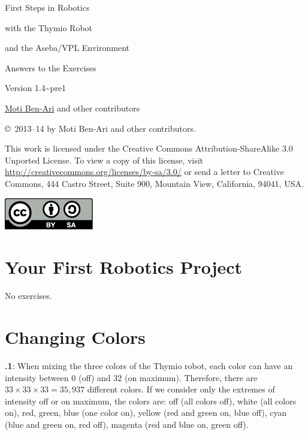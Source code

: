 \documentclass[11pt,a4paper,english]{article}
\begin{document}
\thispagestyle{empty}

\begin{center}
\begin{bfseries}

\begin{Large}
First Steps in Robotics

with the
Thymio Robot

and the
Aseba/VPL Environment

\bigskip

Answers to the Exercises

\end{Large}

Version 1.4{\textasciitilde}pre1

\bigskip

\href{http://www.weizmann.ac.il/sci-tea/benari/}{Moti Ben-Ari} and other contributors

\end{bfseries}
\end{center}

\bigskip

\copyright{}\  2013--14 by Moti Ben-Ari and other contributors.

This work is licensed under the Creative Commons
Attribution-ShareAlike 3.0 Unported License. To view a copy
of this license, visit
\url{http://creativecommons.org/licenses/by-sa/3.0/}
or send a letter to Creative Commons, 444 Castro Street, Suite 900,
Mountain View, California, 94041, USA.

\begin{center}
\hspace{6pt}\includegraphics[width=.2\textwidth]{../images/by-sa}
\end{center}

\section{Your First Robotics Project}

No exercises.

\section{Changing Colors}

\textbf{\thesection.1}: 
When mixing the three colors of the Thymio robot, each color can have
an intensity between 0 (off) and 32 (on maximum). Therefore, there are
$33 \times 33 \times 33=35,937$ different colors. If we consider only
the extremes of intensity off or on maximum, the colors are: off (all
colors off), white (all colors on), red, green, blue (one color on),
yellow (red and green on, blue off), cyan (blue and green on, red off),
magenta (red and blue on, green off).
\end{document}
